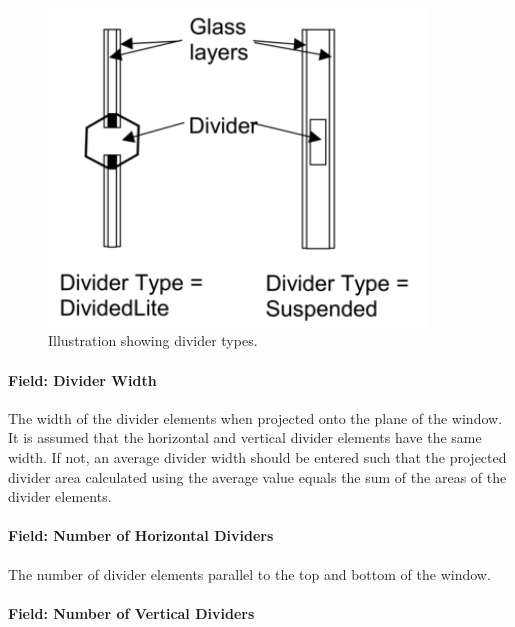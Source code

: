 \begin{figure}[hbtp] %
\centering
\includegraphics[width=0.9\textwidth, height=0.9\textheight, keepaspectratio=true]{media/image063.png}
\caption{Illustration showing divider types. \protect \label{fig:illustration-showing-divider-types.}}
\end{figure}

\paragraph{Field: Divider Width}\label{field-divider-width}

The width of the divider elements when projected onto the plane of the window. It is assumed that the horizontal and vertical divider elements have the same width. If not, an average divider width should be entered such that the projected divider area calculated using the average value equals the sum of the areas of the divider elements.

\paragraph{Field: Number of Horizontal Dividers}\label{field-number-of-horizontal-dividers}

The number of divider elements parallel to the top and bottom of the window.

\paragraph{Field: Number of Vertical Dividers}\label{field-number-of-vertical-dividers}


